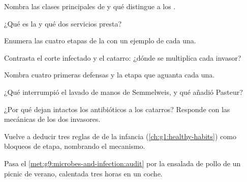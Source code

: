 \begin{exercise}[$\star$]\label{exo:g9:microbes-and-infection:1}
Nombra las clases principales de  y qué distingue a los .
\end{exercise}

\begin{exercise}[$\star$]\label{exo:g9:microbes-and-infection:2}
¿Qué es la  y qué dos servicios presta?
\end{exercise}

\begin{exercise}[$\star$]\label{exo:g9:microbes-and-infection:3}
Enumera las cuatro etapas de la  con un ejemplo de cada una.
\end{exercise}

\begin{exercise}[$\star$]\label{exo:g9:microbes-and-infection:4}
Contrasta el corte infectado y el catarro: ¿dónde se multiplica cada
invasor?
\end{exercise}

\begin{exercise}[$\star$]\label{exo:g9:microbes-and-infection:5}
Nombra cuatro primeras defensas y la etapa que aguanta cada una.
\end{exercise}

\begin{exercise}[$\star$]\label{exo:g9:microbes-and-infection:6}
¿Qué interrumpió el lavado de manos de Semmelweis, y qué añadió
Pasteur?
\end{exercise}

\begin{exercise}[$\star\star$]\label{exo:g9:microbes-and-infection:7}
¿Por qué dejan intactos los antibióticos a los catarros? Responde con
las mecánicas de los dos invasores.
\end{exercise}

\begin{exercise}[$\star\star$]\label{exo:g9:microbes-and-infection:8}
Vuelve a deducir tres reglas de  de la infancia
(\cref{ch:g1:healthy-habits}) como bloqueos de etapa, nombrando el
mecanismo.
\end{exercise}

\begin{exercise}[$\star\star$]\label{exo:g9:microbes-and-infection:9}
Pasa el \cref{met:g9:microbes-and-infection:audit} por la ensalada de
pollo de un picnic de verano, calentada tres horas en un coche.
\end{exercise}

